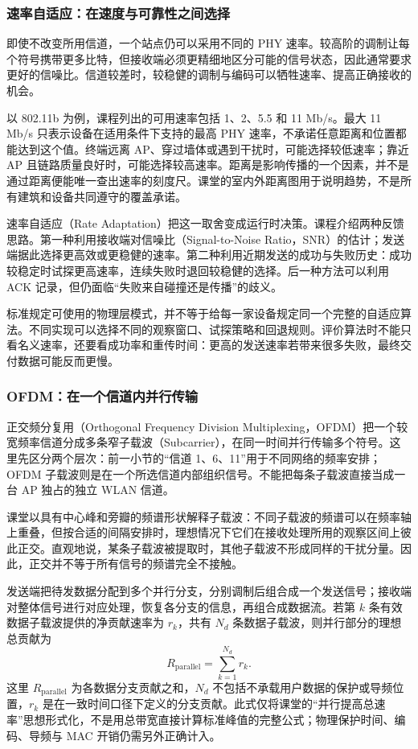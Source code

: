 \subsubsection{速率自适应：在速度与可靠性之间选择}

即使不改变所用信道，一个站点仍可以采用不同的 PHY 速率。较高阶的调制让每个符号携带更多比特，但接收端必须更精细地区分可能的信号状态，因此通常要求更好的信噪比。信道较差时，较稳健的调制与编码可以牺牲速率、提高正确接收的机会。

以 802.11b 为例，课程列出的可用速率包括 1、2、5.5 和 11 Mb/s。最大 11 Mb/s 只表示设备在适用条件下支持的最高 PHY 速率，不承诺任意距离和位置都能达到这个值。终端远离 AP、穿过墙体或遇到干扰时，可能选择较低速率；靠近 AP 且链路质量良好时，可能选择较高速率。距离是影响传播的一个因素，并不是通过距离便能唯一查出速率的刻度尺。课堂的室内外距离图用于说明趋势，不是所有建筑和设备共同遵守的覆盖承诺。

速率自适应（Rate Adaptation）把这一取舍变成运行时决策。课程介绍两种反馈思路。第一种利用接收端对信噪比（Signal-to-Noise Ratio，SNR）的估计；发送端据此选择更高效或更稳健的速率。第二种利用近期发送的成功与失败历史：成功较稳定时试探更高速率，连续失败时退回较稳健的选择。后一种方法可以利用 ACK 记录，但仍面临“失败来自碰撞还是传播”的歧义。

标准规定可使用的物理层模式，并不等于给每一家设备规定同一个完整的自适应算法。不同实现可以选择不同的观察窗口、试探策略和回退规则。评价算法时不能只看名义速率，还要看成功率和重传时间：更高的发送速率若带来很多失败，最终交付数据可能反而更慢。

\subsubsection{OFDM：在一个信道内并行传输}

正交频分复用（Orthogonal Frequency Division Multiplexing，OFDM）把一个较宽频率信道分成多条窄子载波（Subcarrier），在同一时间并行传输多个符号。这里先区分两个层次：前一小节的“信道 1、6、11”用于不同网络的频率安排；OFDM 子载波则是在一个所选信道内部组织信号。不能把每条子载波直接当成一台 AP 独占的独立 WLAN 信道。

课堂以具有中心峰和旁瓣的频谱形状解释子载波：不同子载波的频谱可以在频率轴上重叠，但按合适的间隔安排时，理想情况下它们在接收处理所用的观察区间上彼此正交。直观地说，某条子载波被提取时，其他子载波不形成同样的干扰分量。因此，正交并不等于所有信号的频谱完全不接触。

发送端把待发数据分配到多个并行分支，分别调制后组合成一个发送信号；接收端对整体信号进行对应处理，恢复各分支的信息，再组合成数据流。若第 $k$ 条有效数据子载波提供的净贡献速率为 $r_k$，共有 $N_d$ 条数据子载波，则并行部分的理想总贡献为
\begin{equation}
R_{\mathrm{parallel}}=\sum_{k=1}^{N_d}r_k.
\label{eq:ofdm-intuition}
\end{equation}
这里 $R_{\mathrm{parallel}}$ 为各数据分支贡献之和，$N_d$ 不包括不承载用户数据的保护或导频位置，$r_k$ 是在一致时间口径下定义的分支贡献。此式仅将课堂的“并行提高总速率”思想形式化，不是用总带宽直接计算标准峰值的完整公式；物理保护时间、编码、导频与 MAC 开销仍需另外正确计入。

